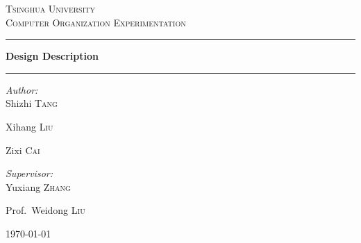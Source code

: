 \documentclass{article}
\begin{document}
\begin{titlepage}
\fancyhead[CH]{}

\hspace{3.0cm}
\begin{center}
\vfill

\textsc{\LARGE Tsinghua University}\\[1.5cm]

\textsc{\Large Computer Organization Experimentation}\\[0.5cm]


\rule[0.75\baselineskip]{0.75\textwidth}{1pt}

{ \huge \bfseries Design Description}\\[0.4cm]

\rule[20\baselineskip]{0.75\textwidth}{1pt}

\begin{minipage}{0.4\textwidth}
\begin{flushleft} \large
\emph{Author:}\\
Shizhi \textsc{Tang}

Xihang \textsc{Liu}

Zixi \textsc{Cai}
\end{flushleft}
\end{minipage}
\begin{minipage}{0.4\textwidth}
\begin{flushright} \large
\emph{Supervisor:} \\
Yuxiang \textsc{Zhang}

Prof.~Weidong \textsc{Liu}
\end{flushright}
\end{minipage}

\vfill
\vspace{3.0cm}
{\large \today}

\end{center}

\end{titlepage}
\setcounter{page}{2}
\tableofcontents
\newpage
\end{document}
